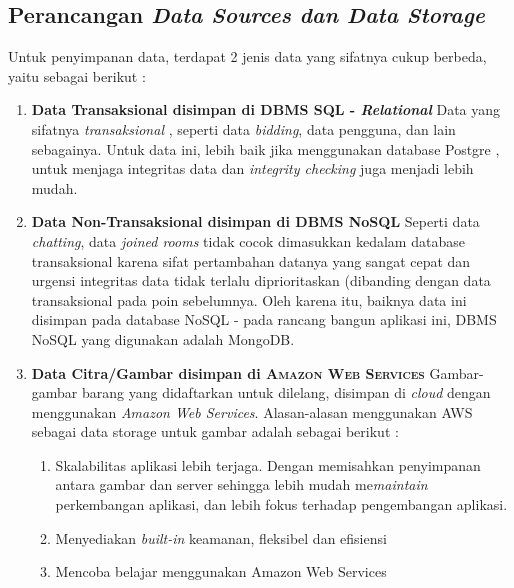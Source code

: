 
\subsection{Perancangan \textit{Data Sources dan Data Storage}}

	Untuk penyimpanan data, terdapat 2 jenis data yang sifatnya cukup berbeda, yaitu sebagai berikut :
    \\
    
    \begin{enumerate}
    \item \textbf{Data Transaksional disimpan di DBMS SQL - \textit{Relational}}
    \newline
    Data yang sifatnya \textit{transaksional} , seperti data \textit{bidding}, data pengguna, dan lain sebagainya.
    Untuk data ini, lebih baik jika menggunakan database Postgre , untuk menjaga integritas data dan \textit{integrity checking} juga  menjadi lebih mudah.
    \newline
    
    \item 
    \textbf{Data Non-Transaksional disimpan di DBMS NoSQL}
    \newline
    Seperti data \textit{chatting}, data \textit{joined rooms} tidak cocok dimasukkan kedalam database transaksional karena sifat pertambahan datanya yang sangat cepat dan urgensi integritas data tidak terlalu diprioritaskan (dibanding dengan data transaksional pada poin sebelumnya.
    \newline
    Oleh karena itu, baiknya data ini disimpan pada database NoSQL - pada rancang bangun aplikasi ini, DBMS NoSQL yang digunakan adalah MongoDB.
    \newline
    
    
    \item \textbf{Data Citra/Gambar disimpan di \textsc{Amazon Web Services}} \newline
    Gambar-gambar barang yang didaftarkan untuk dilelang, disimpan di \textit{cloud} dengan menggunakan \textit{Amazon Web Services}. Alasan-alasan menggunakan AWS sebagai data storage untuk gambar adalah sebagai berikut :
        \begin{enumerate}[noitemsep,topsep=0pt]
        \item Skalabilitas aplikasi lebih terjaga. 
        \newline Dengan memisahkan penyimpanan antara gambar dan server sehingga lebih mudah me\textit{maintain} perkembangan aplikasi, dan lebih fokus terhadap pengembangan aplikasi.
        \item Menyediakan \textit{built-in} keamanan, fleksibel dan efisiensi \cite{wikipedia_amazon_2016}
        \item Mencoba belajar menggunakan Amazon Web Services
        \end{enumerate}
        

\end{enumerate}
